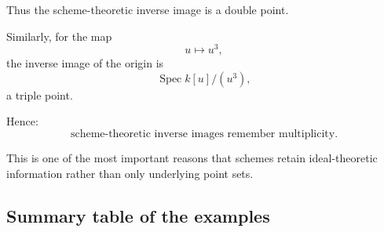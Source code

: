 Thus the scheme-theoretic inverse image is a double point.

Similarly, for the map
\[
u\longmapsto u^3,
\]
the inverse image of the origin is
\[
\operatorname{Spec}k[u]/(u^3),
\]
a triple point.

Hence:
\[
\boxed{
	\text{scheme-theoretic inverse images remember multiplicity.}
}
\]

This is one of the most important reasons that schemes retain ideal-theoretic information rather than only underlying point sets.

\subsection{Summary table of the examples}

